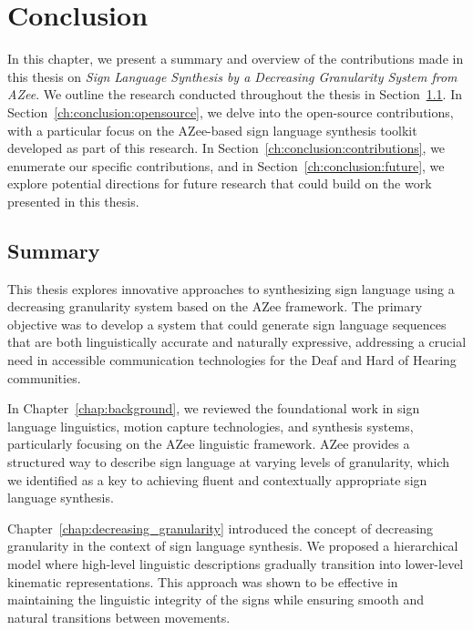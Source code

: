 \documentclass[../../main.tex]{subfiles}
\begin{document}
\chapter{Conclusion}
\label{ch:conclusion}

In this chapter, we present a summary and overview of the contributions made in this thesis on \textit{Sign Language Synthesis by a Decreasing Granularity System from AZee}. We outline the research conducted throughout the thesis in Section~\ref{ch:conclusion:summary}. In Section~\ref{ch:conclusion:opensource}, we delve into the open-source contributions, with a particular focus on the AZee-based sign language synthesis toolkit developed as part of this research. In Section~\ref{ch:conclusion:contributions}, we enumerate our specific contributions, and in Section~\ref{ch:conclusion:future}, we explore potential directions for future research that could build on the work presented in this thesis.

\section{Summary}
\label{ch:conclusion:summary}

This thesis explores innovative approaches to synthesizing sign language using a decreasing granularity system based on the AZee framework. The primary objective was to develop a system that could generate sign language sequences that are both linguistically accurate and naturally expressive, addressing a crucial need in accessible communication technologies for the Deaf and Hard of Hearing communities.

In Chapter~\ref{chap:background}, we reviewed the foundational work in sign language linguistics, motion capture technologies, and synthesis systems, particularly focusing on the AZee linguistic framework. AZee provides a structured way to describe sign language at varying levels of granularity, which we identified as a key to achieving fluent and contextually appropriate sign language synthesis.

Chapter~\ref{chap:decreasing_granularity} introduced the concept of decreasing granularity in the context of sign language synthesis. We proposed a hierarchical model where high-level linguistic descriptions gradually transition into lower-level kinematic representations. This approach was shown to be effective in maintaining the linguistic integrity of the signs while ensuring smooth and natural transitions between movements.
\end{document}
